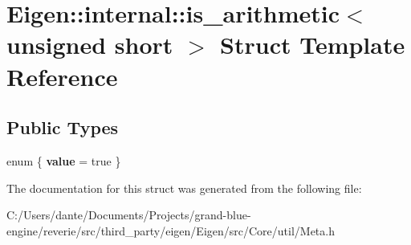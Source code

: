 \hypertarget{struct_eigen_1_1internal_1_1is__arithmetic_3_01unsigned_01short_01_4}{}\section{Eigen\+::internal\+::is\+\_\+arithmetic$<$ unsigned short $>$ Struct Template Reference}
\label{struct_eigen_1_1internal_1_1is__arithmetic_3_01unsigned_01short_01_4}
\subsection*{Public Types}
\begin{DoxyCompactItemize}
\item 
\mbox{\label{struct_eigen_1_1internal_1_1is__arithmetic_3_01unsigned_01short_01_4_adeb7d7dfeddebd6c99fcc76108a2b92f}} 
enum \{ {\bfseries value} = true
 \}
\end{DoxyCompactItemize}


The documentation for this struct was generated from the following file\+:\begin{DoxyCompactItemize}
\item 
C\+:/\+Users/dante/\+Documents/\+Projects/grand-\/blue-\/engine/reverie/src/third\+\_\+party/eigen/\+Eigen/src/\+Core/util/Meta.\+h\end{DoxyCompactItemize}
